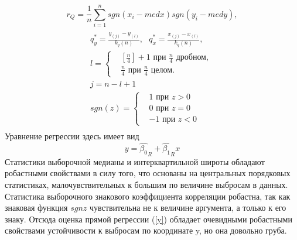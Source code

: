 \begin{equation}
    r_{Q} = \frac{1}{n}\sum_{i=1}^{n}{sgn(x_{i} - med x)sgn(y_{i} - med y)},
    \label{r_Q}
\end{equation}
\begin{multline}
\\
    q^{*}_{y} = \frac{y_{(j)} -y_{(l)}}{k_{q}(n)},~~~
    q^{*}_{x} = \frac{x_{(j)} - x_{(l)}}{k_{q}(n)}, \\ 
    l = \begin{cases}
         & [\frac{n}{4}] + 1 \text{ при } \frac{n}{4} \text{ дробном, } \\ 
         & \frac{n}{4} \text{ при } \frac{n}{4} \text{ целом. }
    \end{cases}\\
    j = n - l + 1\\
    sgn(z) = \begin{cases}
                & 1 \text{ при } z > 0 \\ 
                & 0 \text{ при } z = 0 \\
                & -1 \text{ при } z < 0
             \end{cases}\\
    \label{q*}        
\end{multline}
Уравнение регрессии здесь имеет вид 
\begin{equation}
    y = \hat{\beta_{0}}_{R} +  \hat{\beta_{1}}_{R}x
    \label{y}
\end{equation}
Статистики выборочной медианы и интерквартильной широты обладают робастными свойствами в силу того, что основаны на центральных порядковых статистиках, малочувствительных к большим по величине выбросам в данных. Статистика выборочного знакового коэффициента корреляции робастна, так как знаковая функция $sgn z$ чувствительна не к величине аргумента, а только к его знаку. Отсюда оценка прямой регрессии (\ref{y}) обладает очевидными робастными свойствами устойчивости к выбросам по координате y, но она довольно груба.


